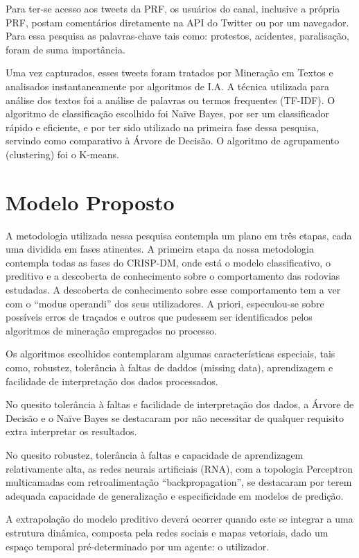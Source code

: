 Para ter-se acesso aos tweets da PRF, os usuários do canal, inclusive a própria PRF, postam comentários diretamente 
na API do Twitter ou por um navegador. Para essa pesquisa as palavras-chave tais como: protestos, acidentes, paralisação, foram de suma importância.

Uma vez capturados, esses tweets foram tratados por Mineração em Textos e analisados instantaneamente por algoritmos de I.A. 
A técnica utilizada para análise dos textos foi a análise de palavras ou termos frequentes (TF-IDF). O algoritmo de classificação escolhido foi Naïve Bayes, por ser um classificador rápido e eficiente, e por ter sido utilizado na primeira fase dessa pesquisa, servindo como comparativo à Árvore de Decisão. O algoritmo de agrupamento (clustering) foi o K-means.



\section{Modelo Proposto}

A metodologia utilizada nessa pesquisa contempla um plano em três etapas, cada uma dividida em fases atinentes.
A primeira etapa da nossa metodologia contempla todas as fases do CRISP-DM, onde está o modelo classificativo, o preditivo e 
a descoberta de conhecimento sobre o comportamento das rodovias estudadas. A descoberta de conhecimento sobre esse comportamento 
 tem a ver com o ``modus operandi'' dos seus utilizadores. A priori, especulou-se sobre possíveis erros de traçados e outros que pudessem
ser identificados pelos algoritmos de mineração empregados no processo.

Os algoritmos escolhidos contemplaram algumas características especiais, tais como, robustez, tolerância à faltas de daddos (missing data), aprendizagem e facilidade de interpretação dos dados processados. 

No quesito tolerância à faltas e facilidade de interpretação dos dados, a Árvore de Decisão e o Naïve Bayes se destacaram por não necessitar de qualquer requisito extra interpretar os resultados.

No quesito robustez, tolerância à faltas e capacidade de aprendizagem relativamente alta, as redes neurais artificiais (RNA), com a topologia Perceptron multicamadas com retroalimentação ``backpropagation'', se destacaram por terem adequada capacidade de generalização e especificidade em modelos de predição. 

A extrapolação do modelo preditivo deverá ocorrer quando este se integrar a uma estrutura dinâmica, composta pela redes sociais e mapas vetoriais, dado um espaço temporal pré-determinado por um agente: o utilizador. 

